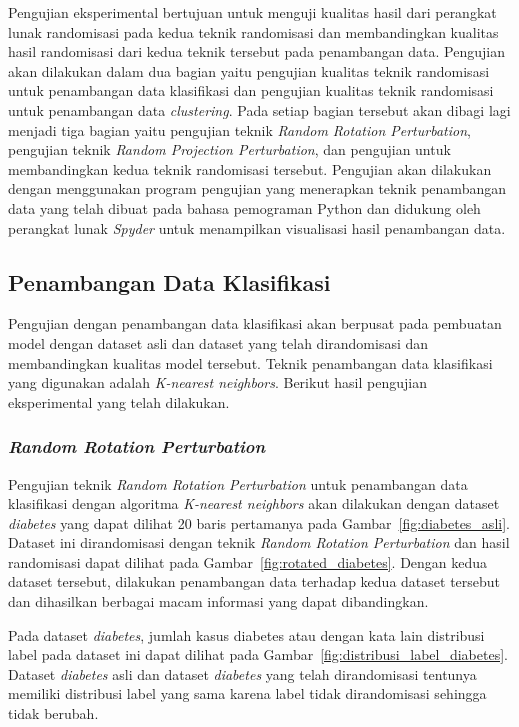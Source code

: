 Pengujian eksperimental bertujuan untuk menguji kualitas hasil dari perangkat lunak randomisasi pada kedua teknik randomisasi dan membandingkan kualitas hasil randomisasi dari kedua teknik tersebut pada penambangan data. Pengujian akan dilakukan dalam dua bagian yaitu pengujian kualitas teknik randomisasi untuk penambangan data klasifikasi dan pengujian kualitas teknik randomisasi untuk penambangan data \textit{clustering}. Pada setiap bagian tersebut akan dibagi lagi menjadi tiga bagian yaitu pengujian teknik \textit{Random Rotation Perturbation}, pengujian teknik \textit{Random Projection Perturbation}, dan pengujian untuk membandingkan kedua teknik randomisasi tersebut. Pengujian akan dilakukan dengan menggunakan program pengujian yang menerapkan teknik penambangan data yang telah dibuat pada bahasa pemograman Python dan didukung oleh perangkat lunak \textit{Spyder} untuk menampilkan visualisasi hasil penambangan data.

\subsection{Penambangan Data Klasifikasi}
\label{sec:pengujian-klasifikasi}
Pengujian dengan penambangan data klasifikasi akan berpusat pada pembuatan model dengan dataset asli dan dataset yang telah dirandomisasi dan membandingkan kualitas model tersebut. Teknik penambangan data klasifikasi yang digunakan adalah \textit{K-nearest neighbors}. Berikut hasil pengujian eksperimental yang telah dilakukan.

\subsubsection{\textit{Random Rotation Perturbation}}
\label{sec:pengujian-klasifikasi-rrp}

Pengujian teknik \textit{Random Rotation Perturbation} untuk penambangan data klasifikasi dengan algoritma \textit{K-nearest neighbors} akan dilakukan dengan dataset \textit{diabetes} yang dapat dilihat 20 baris pertamanya pada Gambar~\ref{fig:diabetes_asli}. Dataset ini dirandomisasi dengan teknik \textit{Random Rotation Perturbation} dan hasil randomisasi dapat dilihat pada Gambar~\ref{fig:rotated_diabetes}. Dengan kedua dataset tersebut, dilakukan penambangan data terhadap kedua dataset tersebut dan dihasilkan berbagai macam informasi yang dapat dibandingkan.

Pada dataset \textit{diabetes}, jumlah kasus diabetes atau dengan kata lain distribusi label pada dataset ini dapat dilihat pada Gambar~\ref{fig:distribusi_label_diabetes}. Dataset \textit{diabetes} asli dan dataset \textit{diabetes} yang telah dirandomisasi tentunya memiliki distribusi label yang sama karena label tidak dirandomisasi sehingga tidak berubah.

